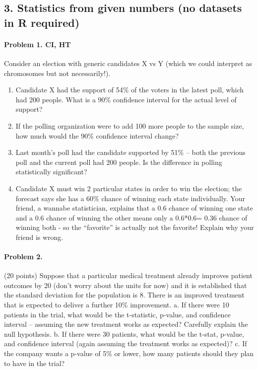 \documentclass[]{article}
\providecommand{\tightlist}{%
  \setlength{\itemsep}{0pt}\setlength{\parskip}{0pt}}
\let\oldparagraph\paragraph
\renewcommand{\paragraph}[1]{\oldparagraph{#1}\mbox{}}
\begin{document}
\subsection{3. Statistics from given numbers (no datasets in R
required)}\label{statistics-from-given-numbers-no-datasets-in-r-required}

\paragraph{Problem 1. CI, HT}\label{problem-1.-ci-ht}

Consider an election with generic candidates X vs Y (which we could
interpret as chromosomes but not necessarily!).

\begin{enumerate}
\def\labelenumi{\alph{enumi}.}
\tightlist
\item
  Candidate X had the support of 54\% of the voters in the latest poll,
  which had 200 people. What is a 90\% confidence interval for the
  actual level of support?
\item
  If the polling organization were to add 100 more people to the sample
  size, how much would the 90\% confidence interval change?
\item
  Last month's poll had the candidate supported by 51\% -- both the
  previous poll and the current poll had 200 people. Is the difference
  in polling statistically significant?
\item
  Candidate X must win 2 particular states in order to win the election;
  the forecast says she has a 60\% chance of winning each state
  individually. Your friend, a wannabe statistician, explains that a 0.6
  chance of winning one state and a 0.6 chance of winning the other
  means only a 0.6*0.6= 0.36 chance of winning both - so the
  ``favorite'' is actually not the favorite! Explain why your friend is
  wrong.
\end{enumerate}

\paragraph{Problem 2.}\label{problem-2.}

(20 points) Suppose that a particular medical treatment already improves
patient outcomes by 20 (don't worry about the units for now) and it is
established that the standard deviation for the population is 8. There
is an improved treatment that is expected to deliver a further 10\%
improvement. a. If there were 10 patients in the trial, what would be
the t-statistic, p-value, and confidence interval -- assuming the new
treatment works as expected? Carefully explain the null hypothesis. b.
If there were 30 patients, what would be the t-stat, p-value, and
confidence interval (again assuming the treatment works as expected)? c.
If the company wants a p-value of 5\% or lower, how many patients should
they plan to have in the trial?
\end{document}
